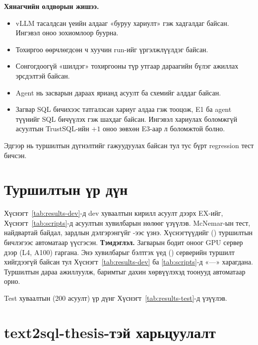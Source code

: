 \textbf{Хянагчийн олдворын жишээ.}
\begin{itemize}
  \item vLLM тасалдсан үеийн алдааг «буруу хариулт» гэж хадгалдаг байсан. Ингэвэл оноо зохиомлоор буурна.
  \item Тохиргоо өөрчлөгдсөн ч хуучин run-ийг үргэлжлүүлдэг байсан.
  \item Сонгогдоогүй «шилдэг» тохиргооны түр утгаар дараагийн бүлэг ажиллах эрсдэлтэй байсан.
  \item Agent нь засварын дараах ярианд асуулт ба схемийг алддаг байсан.
  \item Загвар SQL бичихээс татгалзсан хариуг алдаа гэж тооцож, E1 ба agent түүнийг SQL бичүүлэх гэж шахдаг байсан.
        Ингэвэл хариулах боломжгүй асуултын TrustSQL-ийн $+1$ оноо зөвхөн E3-аар л боломжтой болно.
\end{itemize}
Эдгээр нь туршилтын дүгнэлтийг гажуудуулах байсан тул тус бүрт regression тест бичсэн.

\section{Туршилтын үр дүн}
\label{sec:results}

\ifnum{}
Хүснэгт~\ref{tab:results-dev}-д dev хуваалтын кирилл асуулт дээрх EX-ийг, Хүснэгт~\ref{tab:scripts}-д асуултын
хувилбарын нөлөөг үзүүлэв. McNemar-ын тест, найдвартай байдал, зардлын дэлгэрэнгүйг -ээс
үзнэ. Хүснэгтүүдийг  (\generatedon) туршилтын бичлэгээс автоматаар үүсгэсэн.
\else
\textbf{Тэмдэглэл.} Загварын бодит оноог GPU сервер дээр (L4, A100) гаргана. Энэ хувилбарыг бэлтгэх үед
(\generatedon) серверийн туршилт хийгдээгүй байсан тул Хүснэгт~\ref{tab:results-dev} ба \ref{tab:scripts}-д «---»
харагдана. Туршилтын дараа  ажиллуулж, баримтыг дахин хөрвүүлэхэд тоонууд автоматаар орно.
\fi





\ifnum{}
Test хуваалтын (200 асуулт) үр дүнг Хүснэгт~\ref{tab:results-test}-д үзүүлэв.

\fi

\section{text2sql-thesis-тэй харьцуулалт}
\label{sec:thesis-compare}

